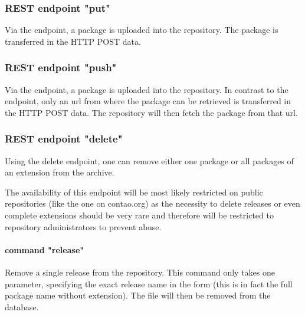 \subsubsection[sec:repository rest api endpoint put]{REST endpoint "put"}

Via the  endpoint, a package is uploaded into the repository. The package is transferred in the HTTP POST data.

\subsubsection[sec:repository rest api endpoint push]{REST endpoint "push"}

Via the  endpoint, a package is uploaded into the repository. In contrast to the  endpoint, only an url from where the package can be retrieved is transferred in the HTTP POST data. The repository will then fetch the package from that url.

\subsubsection[sec:repository rest api endpoint delete]{REST endpoint "delete"}

Using the delete endpoint, one can remove either one package or all packages of an extension from the archive.

The availability of this endpoint will be most likely restricted on public repositories (like the one on contao.org) as the necessity to delete releases or even complete extensions should be very rare and therefore will be restricted to repository administrators to prevent abuse.

\paragraph{command "release"}
Remove a single release from the repository. This command only takes one parameter, specifying the exact release name in the form  (this is in fact the full package name without extension). The file will then be removed from the database.


